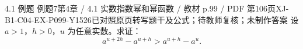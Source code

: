 \par\noindent\begin{minipage}{\linewidth}
\begin{bankitem}{4.1 例题 例题7}{第4章 / 4.1 实数指数幂和幂函数 / 教材 p.99 / PDF 第106页}{XJ-B1-C04-EX-P099-Y1526}{已对照原页转写题干及公式；待教师复核；未制作答案}
设 $a>1$，$h>0$，$u$ 为任意实数。求证：
\[a^{u+2h}-a^{u+h}>a^{u+h}-a^u.\]
\end{bankitem}
\end{minipage}\par\medskip
